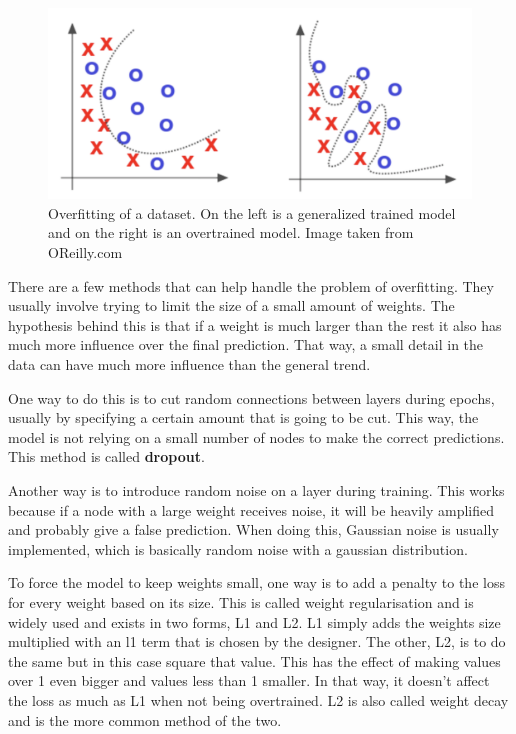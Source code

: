 \begin{figure}[hbtp]
\begin{center}
\includegraphics[width = 1.0\textwidth]{./Images/overfitting.jpg} 
\caption{Overfitting of a dataset. On the left is a generalized trained model and on the right is an overtrained model. Image taken from OReilly.com \cite{overfitting}}
\label{fig:overfitting}
\end{center}
\end{figure}

There are a few methods that can help handle the problem of overfitting. They usually involve trying to limit the size of a small amount of weights.
The hypothesis behind this is that if a weight is much larger than the rest it also has much more influence over the final prediction. That way, a small detail in the data can have much more influence than the general trend.

One way to do this is to cut random connections between layers during epochs, usually by specifying a certain amount that is going to be cut.
This way, the model is not relying on a small number of nodes to make the correct predictions. This method is called \textbf{dropout}.

Another way is to introduce random noise on a layer during training. This works because if a node with a large weight receives noise, it will be heavily amplified and probably give a false prediction.
When doing this, Gaussian noise is usually implemented, which is basically random noise with a gaussian distribution.

To force the model to keep weights small, one way is to add a penalty to the loss for every weight based on its size. 
This is called weight regularisation and is widely used and exists in two forms, L1 and L2.
L1 simply adds the weights size multiplied with an l1 term that is chosen by the designer.
The other, L2, is to do the same but in this case square that value. This has the effect of making values over 1 even bigger and values less than 1 smaller.
In that way, it doesn't affect the loss as much as L1 when not being overtrained. L2 is also called weight decay and is the more common method of the two.

